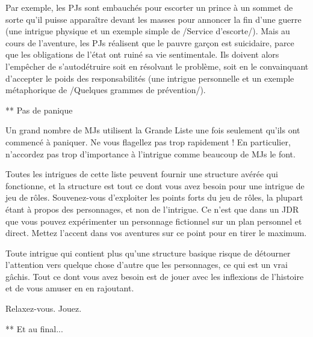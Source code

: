 \begin{enumerate}
Par exemple, les PJs sont embauchés pour escorter un prince à un sommet de sorte qu'il puisse apparaître devant les masses pour annoncer la fin d'une guerre (une intrigue physique et un exemple simple de /Service d'escorte/). Mais au cours de l'aventure, les PJs réalisent que le pauvre garçon est suicidaire, parce que les obligations de l'état ont ruiné sa vie sentimentale. Ils doivent alors l'empêcher de s'autodétruire soit en résolvant le problème, soit en le convainquant d'accepter le poids des responsabilités (une intrigue personnelle et un exemple métaphorique de /Quelques grammes de prévention/).

** Pas de panique

Un grand nombre de MJs utilisent la Grande Liste une fois seulement qu'ils ont commencé à paniquer. Ne vous flagellez pas trop rapidement ! En particulier, n'accordez pas trop d'importance à l'intrigue comme beaucoup de MJs le font.

Toutes les intrigues de cette liste peuvent fournir une structure avérée qui fonctionne, et la structure est tout ce dont vous avez besoin pour une intrigue de jeu de rôles. Souvenez-vous d'exploiter les points forts du jeu de rôles, la plupart étant à propos des personnages, et non de l'intrigue. Ce n'est que dans un JDR que vous pouvez expérimenter un personnage fictionnel sur un plan personnel et direct. Mettez l'accent dans vos aventures sur ce point pour en tirer le maximum.

Toute intrigue qui contient plus qu'une structure basique risque de détourner l'attention vers quelque chose d'autre que les personnages, ce qui est un vrai gâchis. Tout ce dont vous avez besoin est de jouer avec les inflexions de l'histoire et de vous amuser en en rajoutant.

Relaxez-vous. Jouez.

** Et au final...


\end{enumerate}
